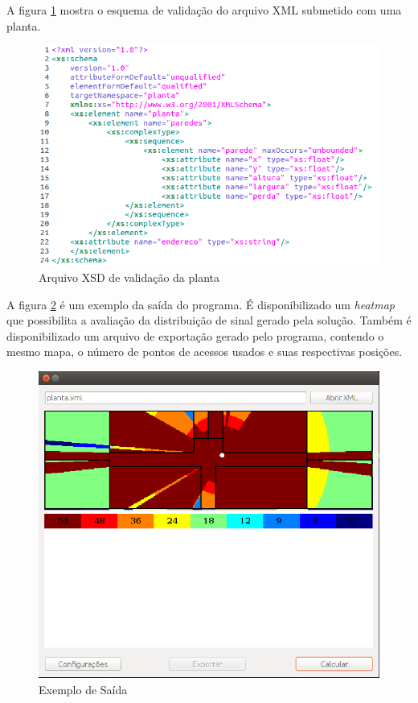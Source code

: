 \documentclass[tc,twoside]{iiufrgs}
\begin{document}
A figura \ref{fig:exemploXsd} mostra o esquema de validação do arquivo XML submetido com uma planta. 

\begin{figure}[h]
	\centering
	\includegraphics[scale=0.5]{img/exXsd.png}
	\caption{Arquivo XSD de validação da planta}
	\label{fig:exemploXsd}
\end{figure}

A figura \ref{fig:exResultado} é um exemplo da saída do programa. É disponibilizado um \textit{heatmap} que possibilita a avaliação da distribuição de sinal gerado pela solução.
Também é disponibilizado um arquivo de exportação gerado pelo programa, contendo o mesmo mapa, o número de pontos de acessos usados e suas respectivas posições.  

\begin{figure}[!h]
	\centering
	\includegraphics[scale=0.4]{img/exResultado.png}
	\caption{Exemplo de Saída}
	\label{fig:exResultado}
\end{figure}
\end{document}
